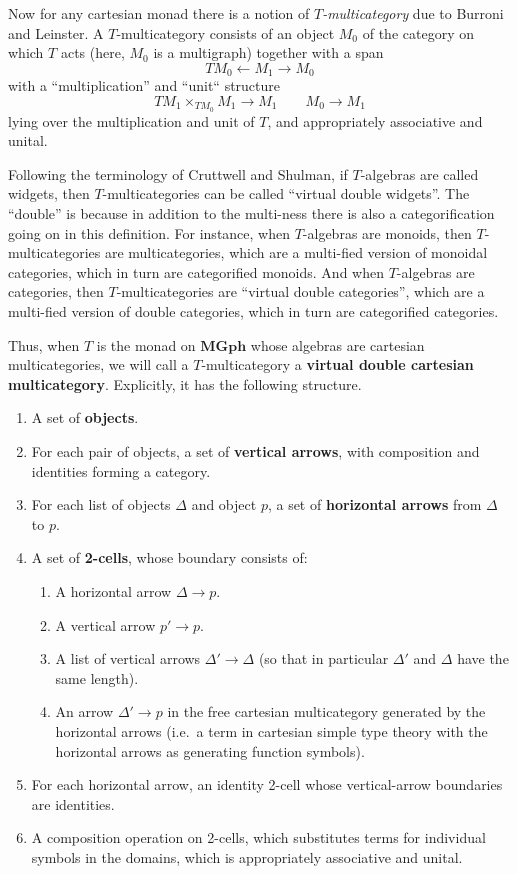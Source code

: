 \documentclass{article}
\newcommand{\mgph}{\mathbf{MGph}}
\begin{document}
Now for any cartesian monad there is a notion of \emph{$T$-multicategory} due to Burroni and Leinster.
A $T$-multicategory consists of an object $M_0$ of the category on which $T$ acts (here, $M_0$ is a multigraph) together with a span
\[ T M_0 \leftarrow M_1 \to M_0 \]
with a ``multiplication'' and ``unit`` structure
\[ T M_1 \times_{T M_0} M_1 \to M_1 \qquad M_0 \to M_1 \]
lying over the multiplication and unit of $T$, and appropriately associative and unital.

Following the terminology of Cruttwell and Shulman, if $T$-algebras are called widgets, then $T$-multicategories can be called ``virtual double widgets''.
The ``double'' is because in addition to the multi-ness there is also a categorification going on in this definition.
For instance, when $T$-algebras are monoids, then $T$-multicategories are multicategories, which are a multi-fied version of monoidal categories, which in turn are categorified monoids.
And when $T$-algebras are categories, then $T$-multicategories are ``virtual double categories'', which are a multi-fied version of double categories, which in turn are categorified categories.

Thus, when $T$ is the monad on $\mgph$ whose algebras are cartesian multicategories, we will call a $T$-multicategory a \textbf{virtual double cartesian multicategory}.
Explicitly, it has the following structure.
\begin{enumerate}
    \item A set of \textbf{objects}.
    \item For each pair of objects, a set of \textbf{vertical arrows}, with composition and identities forming a category.
    \item For each list of objects $\Delta$ and object $p$, a set of \textbf{horizontal arrows} from $\Delta$ to $p$.
    \item A set of \textbf{2-cells}, whose boundary consists of:
    \begin{enumerate}
        \item A horizontal arrow $\Delta \to p$.
        \item A vertical arrow $p'\to p$.
        \item A list of vertical arrows $\Delta'\to\Delta$ (so that in particular $\Delta'$ and $\Delta$ have the same length).
        \item An arrow $\Delta'\to p$ in the free cartesian multicategory generated by the horizontal arrows (i.e.\ a term in cartesian simple type theory with the horizontal arrows as generating function symbols).
    \end{enumerate}
    \item For each horizontal arrow, an identity 2-cell whose vertical-arrow boundaries are identities.
    \item A composition operation on 2-cells, which substitutes terms for individual symbols in the domains, which is appropriately associative and unital.
\end{enumerate}
\end{document}
